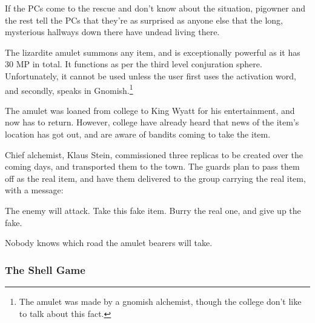 If the PCs come to the rescue and don't know about the situation, \gls{pigowner} and the rest tell the PCs that they're as surprised as anyone else that the long, mysterious hallways down there have undead living there.


The lizardite amulet summons any item, and is exceptionally powerful as it has 30 MP in total.  It functions as per the third level conjuration sphere.  Unfortunately, it cannot be used unless the user first uses the activation word, and secondly, speaks in Gnomish.\footnote{The amulet was made by a gnomish alchemist, though the college don't like to talk about this fact.}

The amulet was loaned from \gls{college} to King Wyatt for his entertainment, and now has to return.  However, \gls{college} have already heard that news of the item's location has got out, and are aware of bandits coming to take the item.

Chief alchemist, Klaus Stein, commissioned three replicas to be created over the coming days, and transported them to the town.  The guards plan to pass them off as the real item, and have them delivered to the group carrying the real item, with a message:

\begin{boxtext}
	The enemy will attack. Take this fake item.  Burry the real one, and give up the fake.
\end{boxtext}

Nobody knows which road the amulet bearers will take.

\subsubsection{The Shell Game}

